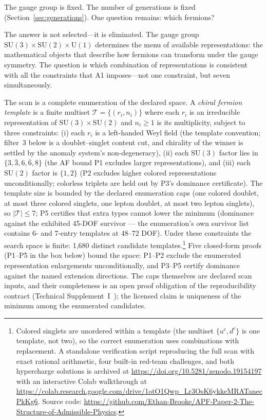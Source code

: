 \documentclass[11pt]{article}
\newcommand{\SU}{\mathrm{SU}}
\newcommand{\U}{\mathrm{U}}
\begin{document}
The gauge group is fixed.  The number of generations is fixed (Section~\ref{sec:generations}).  One question remains: which fermions?

The answer is not selected---it is eliminated.  The gauge group $\SU(3) \times \SU(2) \times \U(1)$ determines the menu of available representations: the mathematical objects that describe how fermions can transform under the gauge symmetry.  The question is which combination of representations is consistent with all the constraints that A1 imposes---not one constraint, but seven simultaneously.

The scan is a complete enumeration of the declared space.  A \emph{chiral fermion template} is a finite multiset $\mathcal{T} = \{(r_i, n_i)\}$ where each $r_i$ is an irreducible representation of $\SU(3) \times \SU(2)$ and $n_i \ge 1$ is its multiplicity, subject to three constraints: (i) each $r_i$ is a left-handed Weyl field (the template convention; filter~3 below is a doublet--singlet content cut, and chirality of the winner is settled by the anomaly system's non-degeneracy), (ii) each $\SU(3)$ factor lies in $\{3, \bar{3}, 6, \bar{6}, 8\}$ (the AF bound P1 excludes larger representations), and (iii) each $\SU(2)$ factor is $\{1, 2\}$ (P2 excludes higher colored representations unconditionally; colorless triplets are held out by P3's dominance certificate).  The template size is bounded by the declared enumeration caps (one colored doublet, at most three colored singlets, one lepton doublet, at most two lepton singlets), so $|\mathcal{T}| \le 7$; P5 certifies that extra types cannot lower the minimum (dominance against the exhibited 45-DOF survivor --- the enumeration's own survivor list contains 6- and 7-entry templates at 48--72 DOF).  Under these constraints the search space is finite: 1{,}680 distinct candidate templates.\footnote{Colored singlets are unordered within a template (the multiset $\{u^c, d^c\}$ is one template, not two), so the correct enumeration uses combinations with replacement.  A standalone verification script reproducing the full scan with exact rational arithmetic, four built-in red-team challenges, and both hypercharge solutions is archived at \url{https://doi.org/10.5281/zenodo.19154197} with an interactive Colab walkthrough at \url{https://colab.research.google.com/drive/1otO1Qwp_Lr3OsK6ykkeMRATanecPkKg6}.  Source code: \url{https://github.com/Ethan-Brooke/APF-Paper-2-The-Structure-of-Admissible-Physics}.}  Five closed-form proofs (P1--P5 in the box below) bound the space: P1--P2 exclude the enumerated representation enlargements unconditionally, and P3--P5 certify dominance against the named extension directions.  The caps themselves are declared scan inputs, and their completeness is an open proof obligation of the reproducibility contract (Technical Supplement~I~\cite{BrookeP2Supplement}); the licensed claim is uniqueness of the minimum among the enumerated candidates.
\end{document}
